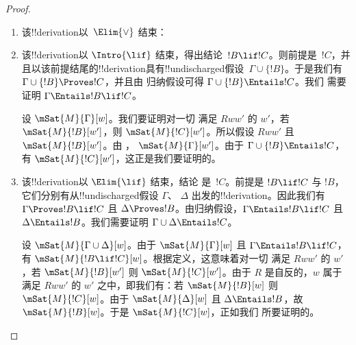 \documentclass[../../../include/open-logic-section]{subfiles}
\begin{document}
\begin{proof}
\begin{enumerate}
  \item 该!!{derivation}以~$\Elim{\lor}$ 结束：

  \item 该!!{derivation}以 $\Intro{\lif}$ 结束，得出结论~$!B\lif
    !C$。则前提是~$!C$，并且以该前提结尾的!!{derivation}具有!!{undischarged}假设~$\Gamma \cup
    \{!B\}$。于是我们有 $\Gamma \cup \{!B\} \Proves !C$，并且由
    归纳假设可得 $\Gamma \cup \{!B\} \Entails !C$。我们
    需要证明 $\Gamma \Entails !B \lif !C$。

    设 $\mSat{M}{\Gamma}[w]$。我们要证明对一切
    满足 $Rww'$ 的 $w'$，若 $\mSat{M}{!B}[w']$，则
    $\mSat{M}{!C}[w']$。所以假设 $Rww'$ 且
    $\mSat{M}{!B}[w']$。由 ，
    $\mSat{M}{\Gamma}[w']$。由于 $\Gamma \cup \{!B\} \Entails !C$，
    有 $\mSat{M}{!C}[w']$，这正是我们要证明的。

  \item 该!!{derivation}以 $\Elim{\lif}$ 结束，结论
    是~$!C$。前提是 $!B \lif !C$ 与 $!B$，它们分别有从!!{undischarged}假设 $\Gamma$、
    $\Delta$ 出发的!!{derivation}。因此我们有 $\Gamma \Proves !B \lif !C$ 且 $\Delta
    \Proves !B$。由归纳假设，$\Gamma \Entails !B \lif !C$
    且 $\Delta \Entails !B$。我们需要证明 $\Gamma \cup \Delta
    \Entails !C$。

    设 $\mSat{M}{\Gamma \cup \Delta}[w]$。由于
    $\mSat{M}{\Gamma}[w]$ 且 $\Gamma \Entails !B \lif !C$，
    有 $\mSat{M}{!B \lif !C}[w]$。根据定义，这意味着对一切
    满足 $Rww'$ 的 $w'$，若 $\mSat{M}{!B}[w']$ 则
    $\mSat{M}{!C}[w']$。由于 $R$ 是自反的，$w$ 属于满足 $Rww'$ 的 $w'$
    之中，即我们有：若 $\mSat{M}{!B}[w]$ 则
    $\mSat{M}{!C}[w]$。由于 $\mSat{M}{\Delta}[w]$ 且 $\Delta
    \Entails !B$，故 $\mSat{M}{!B}[w]$。于是 $\mSat{M}{!C}[w]$，正如我们
    所要证明的。


\end{enumerate}
\end{proof}
\end{document}
